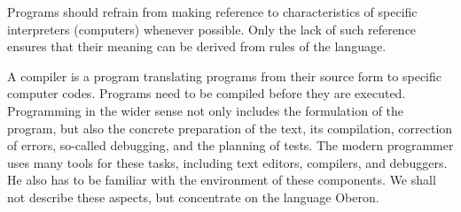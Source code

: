 Programs should refrain from making reference to characteristics of specific interpreters
(computers) whenever possible. Only the lack of such reference ensures that their meaning can be
derived from rules of the language.

A compiler is a program translating programs from their source form to specific computer codes.
Programs need to be compiled before they are executed. Programming in the wider sense not only
includes the formulation of the program, but also the concrete preparation of the text, its
compilation, correction of errors, so-called debugging, and the planning of tests. The modern
programmer uses many tools for these tasks, including text editors, compilers, and debuggers. He
also has to be familiar with the environment of these components. We shall not describe these
aspects, but concentrate on the language Oberon.
